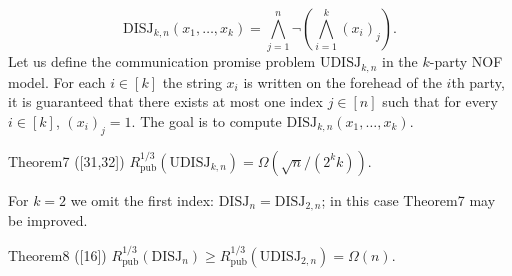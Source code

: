 \[\mathrm{DISJ}_{k,n}(x_1,\ldots,x_k)=\bigwedge_{j=1}^n\neg\left(\bigwedge_{i=1}^k(x_i)_j\right).\]
Let us define the communication promise problem $\mathrm{UDISJ}_{k,n}$ in the $k$-party NOF model. For each $i\in[k]$ the string $x_i$ is written on the forehead of the $i$th party, it is guaranteed that there exists at most one index $j\in[n]$ such that for every $i\in[k]$, $(x_i)_j=1$. The goal is to compute $\mathrm{DISJ}_{k,n}(x_1,\ldots,x_k)$.
\begin{authorclaim}{Theorem7 ([31,32])}
$R^{1/3}_{\mathrm{pub}}(\mathrm{UDISJ}_{k,n})=\Omega(\sqrt n/(2^kk))$.
\end{authorclaim}
For $k=2$ we omit the first index: $\mathrm{DISJ}_n=\mathrm{DISJ}_{2,n}$; in this case Theorem7 may be improved.
\begin{authorclaim}{Theorem8 ([16])}
$R^{1/3}_{\mathrm{pub}}(\mathrm{DISJ}_n)\ge R^{1/3}_{\mathrm{pub}}(\mathrm{UDISJ}_{2,n})=\Omega(n)$.
\end{authorclaim}
